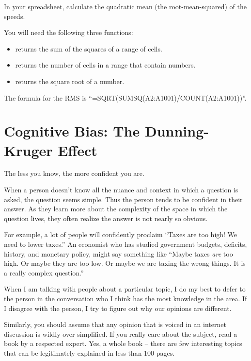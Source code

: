 \begin{Exercise}[title={RMS}, label=rms_spreadsheet]

  In your spreadsheet, calculate the quadratic mean (the root-mean-squared) of the speeds.

  You will need the following three functions:
  \begin{itemize}
  \item {} returns the sum of the squares of a range of cells.
  \item {} returns the number of cells in a range that contain numbers.
  \item {} returns the square root of a number.
  \end{itemize}


\end{Exercise}
\begin{Answer}[ref=rms_spreadsheet]

The formula for the RMS is ``=SQRT(SUMSQ(A2:A1001)/COUNT(A2:A1001))''.

\end{Answer}

\section{Cognitive Bias: The Dunning-Kruger Effect}

The less you know, the more confident you are.

When a person doesn't know all the nuance and context in which a question is
asked, the question seems simple. Thus the person tends to be confident in
their answer.  As they learn more about the complexity of the space in
which the question lives, they often realize the answer is not nearly so
obvious.

For example, a lot of people will confidently proclaim ``Taxes are too
high! We need to lower taxes.''  An economist who has studied
government budgets, deficits, history, and monetary policy, might say
something like ``Maybe taxes \emph{are} too high.  Or maybe they are
too low. Or maybe we are taxing the wrong things. It is a really
complex question.''

When I am talking with people about a particular topic, I do my best
to defer to the person in the conversation who I think has the most
knowledge in the area. If I disagree with the person, I try to figure
out why our opinions are different.

Similarly, you should assume that any opinion that is voiced in an
internet discussion is wildly over-simplified.  If you really care
about the subject, read a book by a respected expert. Yes, a whole
book -- there are few interesting topics that can be legitimately
explained in less than 100 pages.
